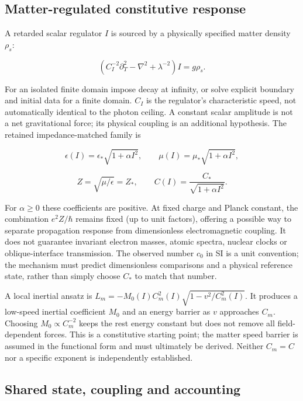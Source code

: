 \documentclass[
  11pt,
  twoside]{article}
\begin{document}
\subsection{Matter-regulated constitutive
response}\label{matter-regulated-constitutive-response}

A retarded scalar regulator \(I\) is sourced by a physically specified
matter density \(\rho_s\):

\[\left(C_I^{-2}\partial_T^2-\nabla^2+\lambda^{-2}\right)I=g\rho_s.\]

For an isolated finite domain impose decay at infinity, or solve
explicit boundary and initial data for a finite domain. \(C_I\) is the
regulator's characteristic speed, not automatically identical to the
photon ceiling. A constant scalar amplitude is not a net gravitational
force; its physical coupling is an additional hypothesis. The retained
impedance-matched family is

\[\epsilon(I)=\epsilon_*\sqrt{1+\alpha I^2},\qquad \mu(I)=\mu_*\sqrt{1+\alpha I^2},\]

\[Z=\sqrt{\mu/\epsilon}=Z_*,\qquad C(I)=\frac{C_*}{\sqrt{1+\alpha I^2}}.\]

For \(\alpha\geq0\) these coefficients are positive. At fixed charge and
Planck constant, the combination \(e^2 Z/\hbar\) remains fixed (up to
unit factors), offering a possible way to separate propagation response
from dimensionless electromagnetic coupling. It does not guarantee
invariant electron masses, atomic spectra, nuclear clocks or
oblique-interface transmission. The observed number \(c_0\) in SI is a
unit convention; the mechanism must predict dimensionless comparisons
and a physical reference state, rather than simply choose \(C_*\) to
match that number.

A local inertial ansatz is
\(L_m=-M_0(I) C_m^2(I)\sqrt{1-v^2/C_m^2(I)}\). It produces a low-speed
inertial coefficient \(M_0\) and an energy barrier as \(v\) approaches
\(C_m\). Choosing \(M_0\propto C_m^{-2}\) keeps the rest energy constant
but does not remove all field-dependent forces. This is a constitutive
starting point; the matter speed barrier is assumed in the functional
form and must ultimately be derived. Neither \(C_m=C\) nor a specific
exponent is independently established.

\subsection{Shared state, coupling and
accounting}\label{shared-state-coupling-and-accounting}
\end{document}
